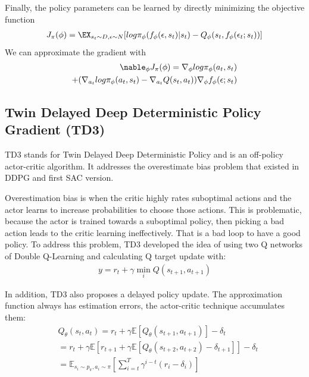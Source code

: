     Finally, the policy parameters can be learned by directly minimizing the objective function\\
    \begin{align}
        J_\pi(\phi) = \EX_{s_t \sim D, \epsilon \sim N} [log \pi_\phi(f_\phi(\epsilon,s_t)|s_t) - Q_\phi (s_t,f_\phi(\epsilon_t;s_t))]
    \end{align}
    We can approximate the gradient with\\
    \begin{align}
        \nable_\phi J_\pi(\phi) = \nabla_\phi log\pi_\phi(a_t,s_t) \\
        + (\nabla_{a_t}log\pi_\phi(a_t,s_t) - \nabla_{a_t}Q(s_t,a_t)) \nabla_\phi f_\phi(\epsilon;s_t)
    \end{align}
    
\subsection{Twin Delayed Deep Deterministic Policy Gradient (TD3)}
TD3 stands for Twin Delayed Deep Deterministic Policy and is an off-policy actor-critic algorithm. It addresses the overestimate bias problem that existed in DDPG and first SAC version.

Overestimation bias is when the critic highly rates suboptimal actions and the actor learns to increase probabilities to choose those actions. This is problematic, because the actor is trained towards a suboptimal policy, then picking a bad action leads to the critic learning ineffectively. That is a bad loop to have a good policy. To address this problem, TD3 developed the idea of using two Q networks of Double Q-Learning and calculating Q target update with:
\begin{align}
y=r_{t}+\gamma \min \limits_{i} Q(s_{t+1}, a_{t+1})
\end{align}

In addition, TD3 also proposes a delayed policy update. The approximation function always has estimation errors, the actor-critic technique accumulates them:
\begin{equation}
\begin{split}
    &Q_{\theta}\left(s_{t}, a_{t}\right)=r_{t}+\gamma \mathbb{E}\left[Q_{\theta}\left(s_{t+1}, a_{t+1}\right)\right]-\delta_{t} \\
    &=r_{t}+\gamma \mathbb{E}\left[r_{t+1}+\gamma \mathbb{E}\left[Q_{\theta}\left(s_{t+2}, a_{t+2}\right)-\delta_{t+1}\right]\right]-\delta_{t} \\
    &=\mathbb{E}_{s_{i} \sim p_{\pi}, a_{i} \sim \pi}\left[\sum_{i=t}^{T} \gamma^{i-t}\left(r_{i}-\delta_{i}\right)\right]
\end{split}
\end{equation}

